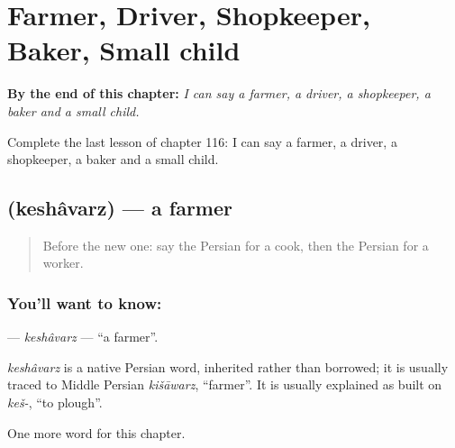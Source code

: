 
\chapter{Farmer, Driver, Shopkeeper, Baker, Small child}
\label{ch:fa-farmer-driver-shopkeeper-baker-small-child}

\begin{chapteropening}
\textbf{By the end of this chapter:} \emph{I can say a farmer, a driver, a shopkeeper, a baker and a small child.}

Complete the last lesson of chapter 116: I can say a farmer, a driver, a shopkeeper, a baker and a small child.
\end{chapteropening}

\section[\texorpdfstring{\fa{کشاورز} (keshâvarz)}{کشاورز (keshâvarz)}]{ (keshâvarz) — a farmer}

\label{lesson:FA-C116-keshavarz}



\begin{quote}
Before the new one: say the Persian for a cook, then the Persian for a worker.
\end{quote}

\subsection*{You'll want to know: }
\textbf{} — \emph{keshâvarz} — \textquotedblleft{}a farmer\textquotedblright{}.

\begin{cousinweb}
\emph{keshâvarz} is a native Persian word, inherited rather than borrowed; it is usually traced to Middle Persian \emph{kišāwarz}, \textquotedblleft{}farmer\textquotedblright{}. It is usually explained as built on \emph{keš-}, \textquotedblleft{}to plough\textquotedblright{}.
\end{cousinweb}

\begin{grammarlens}[title={What you've built}]
One more word for this chapter.
\end{grammarlens}

